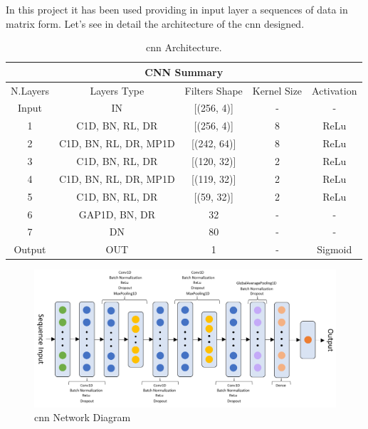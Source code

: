 \documentclass{article}
\begin{document}
\noindent
In this project it has been used providing in input layer a sequences of data in matrix form. Let's see in detail the architecture of the \acrshort{cnn} designed. 

\begin{table}[!ht]
\begin{center}
\begin{tabular}{ |c|c|c|c|c| }
 \hline
 \multicolumn{5}{|c|}{CNN Summary} \\
 \hline
    N.Layers & Layers Type & Filters Shape & Kernel Size & Activation\\
 \hline
    Input   &   \acrshort{IN}   &   [(256, 4)]  &   -   &   -   \\
    1   &   \acrshort{C1D}, \acrshort{BN}, \acrshort{RL}, \acrshort{DR} &  [(256, 4)] & 8 &   ReLu\\
    2   &   \acrshort{C1D}, \acrshort{BN}, \acrshort{RL}, \acrshort{DR}, \acrshort{MP1D} &  [(242, 64)] & 8 &   ReLu\\
    3   &   \acrshort{C1D}, \acrshort{BN}, \acrshort{RL}, \acrshort{DR} & [(120, 32)] & 2 &   ReLu\\
    4   &   \acrshort{C1D}, \acrshort{BN}, \acrshort{RL}, \acrshort{DR}, \acrshort{MP1D} & [(119, 32)] & 2 &   ReLu\\
    5   &   \acrshort{C1D}, \acrshort{BN}, \acrshort{RL}, \acrshort{DR} & [(59, 32)] & 2 &   ReLu\\
    6   &   \acrshort{GAP1D}, \acrshort{BN}, \acrshort{DR} & 32 & - &   -\\
    7   &   \acrshort{DN} & 80 & - &   -\\
    Output  &   \acrshort{OUT}  & 1 & - &   Sigmoid\\
 \hline
\end{tabular}
\caption{\label{tab:CNN_Summary} \acrshort{cnn}  Architecture.}
\end{center}
\end{table}

\begin{figure}[!ht]
    \centering
    \includegraphics[width=12cm]{image/CNN_Diagram.PNG}
    \caption{\acrshort{cnn} Network Diagram}
    \label{fig:CNN_Diagram}
\end{figure}
\end{document}
